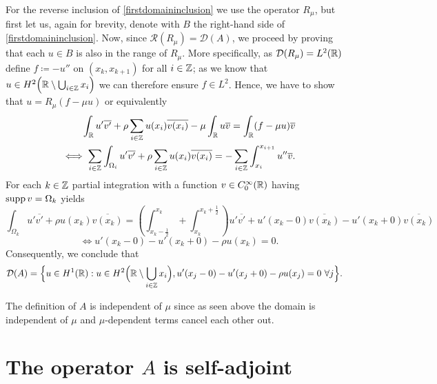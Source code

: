 For the reverse inclusion of \eqref{firstdomaininclusion} we use the operator $R_{\mu}$, but first let us, again for brevity, denote with $B$ the right-hand side of \eqref{firstdomaininclusion}. Now, since $\mathcal{R}(R_{\mu}) = \mathcal{D}(A)$, we proceed by proving that each $u \in B$ is also in the range of $R_{\mu}$. More specifically, as $\mathcal{D}(R_{\mu}) = L^{2}(\mathbb{R})$ define $f \coloneqq - u''$ on $(x_{k}, x_{k + 1})$ for all $i \in \mathbb{Z}$; as we know that $u \in H^{2}\Big(\mathbb{R} \setminus \bigcup_{i \in \mathbb{Z}} x_{i} \Big)$ we can therefore ensure $f \in L^{2}$. Hence, we have to show that $u = R_{\mu}(f - \mu u)$ or equivalently 
	\begin{align*}
		 \int_{\mathbb{R}} u' \overline{v'} + \rho \sum_{i \in \mathbb{Z}} u(x_{i}) \overline{v(x_{i})} - \mu \int_{\mathbb{R}} u \overline{v}= \int_{\mathbb{R}}(f-\mu u) \overline{v} \\
		\iff \sum_{i \in \mathbb{Z}} \int_{\Omega_{i}} u' \overline{v'} + \rho \sum_{i \in \mathbb{Z}} u(x_{i}) \overline{v(x_{i})} = - \sum_{i \in \mathbb{Z}} \int_{x_{i}}^{x_{i+1}} u'' \overline{v}.
	\end{align*}
For each $k \in \mathbb{Z}$ partial integration with a function $v \in C_{0}^{\infty}(\mathbb{R})$ having $\operatorname{supp} v = \Omega_{k}$ yields
	\[ \int_{\Omega_{k}} u' \overline{v'} + \rho u(x_{k}) \overline{v(x_{k})} =\left( \int_{x_{k} - \frac{1}{2}}^{x_{k}} + \int_{x_{k}}^{x_{k} +\frac{1}{2}} \right) u' \overline{v'} + u'(x_{k}-0) \overline{v(x_{k})}  - u'(x_{k}+0) \overline{v(x_{k})}  \]
	\[ \iff u'(x_{k}-0) - u'(x_{k}+0) - \rho u(x_{k}) = 0. \]
Consequently, we conclude that
	\begin{align*}
		\mathcal{D}(A) & = \Big\{ u \in H^{1}(\mathbb{R}): u \in H^{2}\Big(\mathbb{R} \setminus \bigcup_{i \in \mathbb{Z}} x_{i} \Big), u'(x_{j} - 0) - u'(x_{j} + 0) - \rho u(x_{j}) = 0 ~\forall j \Big\}.
	\end{align*}
\begin{remark}
	The definition of $A$ is independent of $\mu$ since as seen above the domain is independent of $\mu$ and $\mu$-dependent terms cancel each other out.
\end{remark}

\section{The operator $A$ is self-adjoint}


